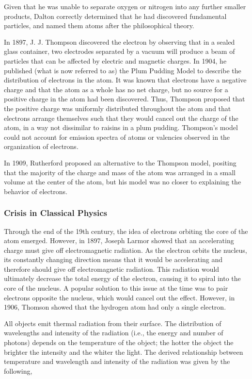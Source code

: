 Given that he was unable to separate oxygen or nitrogen into any further smaller products, Dalton correctly determined that he had discovered fundamental particles, and named them atoms after the philosophical theory.

In 1897, J. J. Thompson discovered the electron by observing that in a sealed glass container, two electrodes separated by a vacuum will produce a beam of particles that can be affected by electric and magnetic charges. In 1904, he published (what is now referred to as) the Plum Pudding Model to describe the distribution of electrons in the atom. It was known that electrons have a negative charge and that the atom as a whole has no net charge, but no source for a positive charge in the atom had been discovered. Thus, Thompson proposed that the positive charge was uniformly distributed throughout the atom and that electrons arrange themselves such that they would cancel out the charge of the atom, in a way not dissimilar to raisins in a plum pudding. Thompson's model could not account for emission spectra of atoms or valencies observed in the organization of electrons.

In 1909, Rutherford proposed an alternative to the Thompson model, positing that the majority of the charge and mass of the atom was arranged in a small volume at the center of the atom, but his model was no closer to explaining the behavior of electrons.

\subsubsection{Crisis in Classical Physics}

Through the end of the 19th century, the idea of electrons orbiting the core of the atom emerged. However, in 1897, Joseph Larmor showed that an accelerating charge must give off electromagnetic radiation. As the electron orbits the nucleus, its constantly changing direction means that it would be accelerating and therefore should give off electromagnetic radiation. This radiation would ultimately decrease the total energy of the electron, causing it to spiral into the core of the nucleus. A popular solution to this issue at the time was to pair electrons opposite the nucleus, which would cancel out the effect. However, in 1906, Thomson showed that the hydrogen atom had only a single electron.

All objects emit thermal radiation from their surface. The distribution of wavelengths and intensity of the radiation (i.e., the energy and number of photons) depends on the temperature of the object; the hotter the object the brighter the intensity and the whiter the light. The derived relationship between temperature and wavelength and intensity of the radiation was given by the following,

